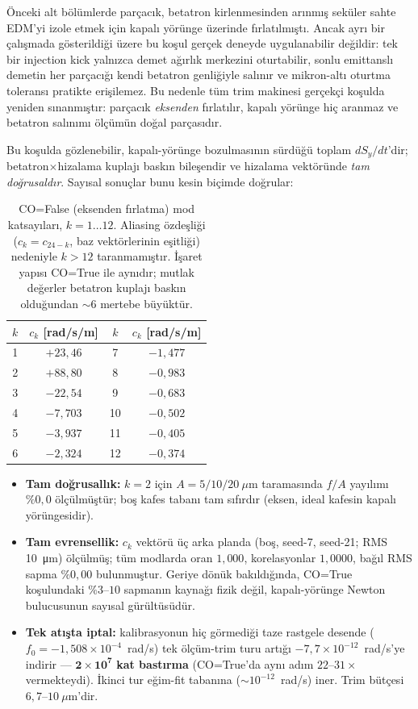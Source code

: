 \documentclass[preprint,12pt]{elsarticle}
\begin{document}
Önceki alt bölümlerde parçacık, betatron kirlenmesinden arınmış seküler
sahte EDM'yi izole etmek için kapalı yörünge üzerinde fırlatılmıştı.
Ancak ayrı bir çalışmada gösterildiği üzere bu koşul gerçek deneyde
uygulanabilir değildir: tek bir injection kick yalnızca demet
ağırlık merkezini oturtabilir, sonlu emittanslı demetin her parçacığı
kendi betatron genliğiyle salınır ve mikron-altı oturtma toleransı
pratikte erişilemez. Bu nedenle tüm trim makinesi gerçekçi koşulda
yeniden sınanmıştır: parçacık \emph{eksenden} fırlatılır, kapalı yörünge
hiç aranmaz ve betatron salınımı ölçümün doğal parçasıdır.

Bu koşulda gözlenebilir, kapalı-yörünge bozulmasının sürdüğü toplam
$dS_y/dt$'dir; betatron$\times$hizalama kuplajı baskın bileşendir ve
hizalama vektöründe \emph{tam doğrusaldır}. Sayısal sonuçlar bunu kesin
biçimde doğrular:

\begin{table}[h]
\centering
\caption{CO=False (eksenden fırlatma) mod katsayıları, $k=1\ldots12$.
Aliasing özdeşliği ($c_k=c_{24-k}$, baz vektörlerinin eşitliği) nedeniyle
$k>12$ taranmamıştır. İşaret yapısı CO=True ile aynıdır; mutlak değerler
betatron kuplajı baskın olduğundan $\sim$6 mertebe büyüktür.}
\label{tab:ck-cofalse}
\begin{tabular}{cc|cc}
\toprule
$k$ & $c_k$ [rad/s/m] & $k$ & $c_k$ [rad/s/m] \\
\midrule
1 & $+23{,}46$ & 7  & $-1{,}477$ \\
2 & $+88{,}80$ & 8  & $-0{,}983$ \\
3 & $-22{,}54$ & 9  & $-0{,}683$ \\
4 & $-7{,}703$ & 10 & $-0{,}502$ \\
5 & $-3{,}937$ & 11 & $-0{,}405$ \\
6 & $-2{,}324$ & 12 & $-0{,}374$ \\
\bottomrule
\end{tabular}
\end{table}

\begin{itemize}
  \item \textbf{Tam doğrusallık:} $k=2$ için $A=5/10/20~\mu$m
    taramasında $f/A$ yayılımı $\%0{,}0$ ölçülmüştür; boş kafes tabanı
    tam sıfırdır (eksen, ideal kafesin kapalı yörüngesidir).
  \item \textbf{Tam evrensellik:} $c_k$ vektörü üç arka planda (boş,
    seed-7, seed-21; RMS \SI{10}{\micro\meter}) ölçülmüş; tüm modlarda
    oran $1{,}000$, korelasyonlar $1{,}0000$, bağıl RMS sapma
    $\%0{,}00$ bulunmuştur. Geriye dönük bakıldığında, CO=True
    koşulundaki $\%3$--$10$ sapmanın kaynağı fizik değil, kapalı-yörünge
    Newton bulucusunun sayısal gürültüsüdür.
  \item \textbf{Tek atışta iptal:} kalibrasyonun hiç görmediği taze
    rastgele desende ($f_0=-1{,}508\times10^{-4}$~rad/s) tek ölçüm-trim
    turu artığı $-7{,}7\times10^{-12}$~rad/s'ye indirir —
    $\mathbf{2{\times}10^7}$ \textbf{kat bastırma} (CO=True'da aynı adım
    $22$--$31\times$ vermekteydi). İkinci tur eğim-fit tabanına
    ($\sim10^{-12}$~rad/s) iner. Trim bütçesi $6{,}7$--$10~\mu$m'dir.
\end{itemize}
\end{document}
